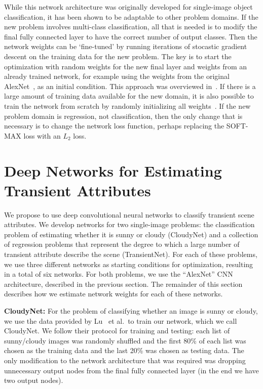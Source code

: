 \documentclass{article}
\begin{document}
While this network architecture was originally developed for
single-image object classification, it has been shown to be adaptable
to other problem domains. If the new problem involves multi-class
classification, all that is needed is to modify the final fully
connected layer to have the correct number of output classes. Then the
network weights can be `fine-tuned' by running iterations of stocastic
gradient descent on the training data for the new problem.  The key is
to start the optimization with random weights for the new final layer
and weights from an already trained network, for example using the
weights from the original AlexNet~\cite{caffenetnips12}, as an initial
condition. This approach was overviewed
in~\cite{yosinski2014transferable}. If there is a large amount of
training data available for the new domain, it is also possible to
train the network from scratch by randomly initializing all
weights~\cite{zhou2014places}.  If the new problem domain is
regression, not classification, then the only change that is necessary
is to change the network loss function, perhaps replacing the SOFT-MAX
loss with an $L_2$ loss.

\section{Deep Networks for Estimating Transient Attributes}

We propose to use deep convolutional neural networks to classify
transient scene attributes. We develop networks for two single-image
problems: the classification problem of estimating whether it is sunny
or cloudy (CloudyNet) and a collection of regression problems that
represent the degree to which a large number of transient attribute
describe the scene (TransientNet).  For each of these problems, we
use three different networks as starting conditions for optimization,
resulting in a total of six networks.  For both problems, we use the
``AlexNet'' CNN architecture, described in the previous section.  The
remainder of this section describes how we estimate network weights
for each of these networks.

\textbf{CloudyNet:} For the problem of classifying whether an image is
sunny or cloudy, we use the data provided by Lu~\cite{lutwoclass} et
al.\ to train our network, which we call CloudyNet.  We follow their
protocol for training and testing: each list of sunny/cloudy images
was randomly shuffled and the first 80\% of each list was chosen as
the training data and the last 20\% was chosen as testing data.  The
only modification to the network architecture that was required was
dropping unnecessary output nodes from the final fully connected layer
(in the end we have two output nodes).
\end{document}
